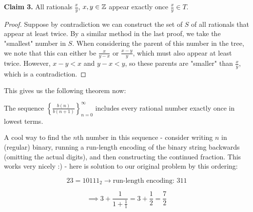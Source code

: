 \documentclass[11pt,twosided]{article}
\begin{document}
\textbf{Claim 3.} All rationals $\frac{x}{y}$, $x, y \in \mathbb Z$ appear exactly once $\frac{x}{y} \in T$. 
\begin{proof}
Suppose by contradiction we can construct the set of $S$ of all rationals that appear at least twice. By a similar method in the last proof, we take the "smallest" number in $S$. When considering the parent of this number in the tree, we note that this can either be $\frac{x}{y-x}$ or $\frac{x-y}{y}$, which must also appear at least twice. However, $x - y < x$ and $y - x < y$, so these parents are "smaller" than $\frac{x}{y}$, which is a contradiction. 
\end{proof}

This gives us the following theorem now: 
\begin{theorem}
The sequence $\left\{\frac{b(n)}{b(n+1)}\right\}_{n=0}^\infty$ includes every rational number exactly once in lowest terms. 
\end{theorem}

A cool way to find the $n$th number in this sequence - consider writing $n$ in (regular) binary, running a run-length encoding of the binary string backwards (omitting the actual digits), and then constructing the continued fraction. This works very nicely :) - here is solution to our original problem by this ordering: 

\[
 23 = 10111_2 \rightarrow \text{run-length encoding: } 311
\]

\[
\implies 3 + \frac{1}{1 + \frac{1}{1}} = 3 + \frac{1}{2} = \frac{7}{2}
\]
\end{document}

